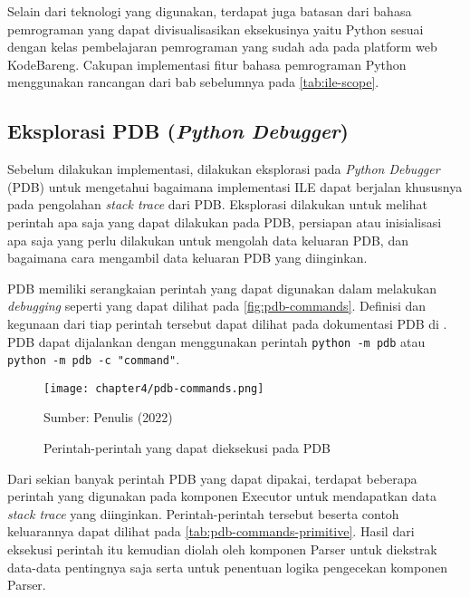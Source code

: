 Selain dari teknologi yang digunakan, terdapat juga batasan dari bahasa pemrograman yang dapat divisualisasikan eksekusinya yaitu Python sesuai dengan kelas pembelajaran pemrograman yang sudah ada pada platform web KodeBareng. Cakupan implementasi fitur bahasa pemrograman Python menggunakan rancangan dari bab sebelumnya pada \autoref{tab:ile-scope}.

\subsection{Eksplorasi PDB (\textit{Python Debugger})}

Sebelum dilakukan implementasi, dilakukan eksplorasi pada \textit{Python Debugger} (PDB) untuk mengetahui bagaimana implementasi ILE dapat berjalan khususnya pada pengolahan \textit{stack trace} dari PDB. Eksplorasi dilakukan untuk melihat perintah apa saja yang dapat dilakukan pada PDB, persiapan atau inisialisasi apa saja yang perlu dilakukan untuk mengolah data keluaran PDB, dan bagaimana cara mengambil data keluaran PDB yang diinginkan.

PDB memiliki serangkaian perintah yang dapat digunakan dalam melakukan \textit{debugging} seperti yang dapat dilihat pada \autoref{fig:pdb-commands}. Definisi dan kegunaan dari tiap perintah tersebut dapat dilihat pada dokumentasi PDB di \textcite{pdb2022documentation}. PDB dapat dijalankan dengan menggunakan perintah \verb|python -m pdb| atau \verb|python -m pdb -c "command"|.

\begin{figure}[H]
  \centering
  \texttt{[image: chapter4/pdb-commands.png]}
  \caption{Perintah-perintah yang dapat dieksekusi pada PDB} \label{fig:pdb-commands}
  Sumber: Penulis (2022)
\end{figure}

Dari sekian banyak perintah PDB yang dapat dipakai, terdapat beberapa perintah yang digunakan pada komponen Executor untuk mendapatkan data \textit{stack trace} yang diinginkan. Perintah-perintah tersebut beserta contoh keluarannya dapat dilihat pada \autoref{tab:pdb-commands-primitive}. Hasil dari eksekusi perintah itu kemudian diolah oleh komponen Parser untuk diekstrak data-data pentingnya saja serta untuk penentuan logika pengecekan komponen Parser.

